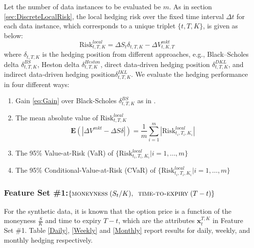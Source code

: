\documentclass[letterpaper,12pt,titlepage,oneside,final]{book}
\numberwithin{equation}{section}
\theoremstyle{definition}
\newcommand{\vx}{\mathbf{x}}
\newcommand{\E}{\mathbf{E}}
\newcommand{\DS}{\Delta S}
\newcommand{\DVmkt}{\Delta V^{mkt}}
\newcommand{\DT}{\Delta t}
\newcommand{\MeanAbs}{\E(|\DVmkt-\DS \delta |)}
\newcommand{\Smkt}{S}
\begin{document}
Let the number of data instances to be evaluated be $m$.
As  in section \ref{sec:DiscreteLocalRisk},  the local hedging risk over the fixed time interval $\DT$ for each data instance, which corresponds to a unique triplet $\{t,T,K\}$, is given as below:
\[
	\text{Risk}^{local}_{t,T,K}=\Delta \Smkt_{t} \delta_{t,T,K} -\Delta V^{mkt}_{t,K,T}
\]
where $\delta_{t,T,K}$ is the hedging position from different approaches, e.g., Black–Scholes delta $\delta^{BS}_{t,T,K}$, Heston delta $\delta^{Heston}_{t,T,K}$, direct data-driven hedging position $\delta^{DKL}_{t,T,K}$, and  indirect data-driven hedging position$\delta^{IKL}_{t,T,K}$.
We evaluate the  hedging performance in four different ways:
\begin{enumerate}
	\item Gain \eqref{eq:Gain} over Black-Scholes $\delta^{BS}_{t,T,K}$ as in \cite{hulloptimal}.
	\item The mean absolute value of $\text{Risk}^{local}_{t,T,K}$
	\[
		\MeanAbs=\frac{1}{m}\sum_{i=1}^m |\text{Risk}^{local}_{t_i,T_i,K_i}|
	\]

	\item The 95\% Value-at-Risk (VaR) of $\{\text{Risk}^{local}_{t_i,T_i,K_i}| i=1,\dots, m\}$
	\item The 95\% Conditional-Value-at-Risk (CVaR) of $\{\text{Risk}^{local}_{t_i,T_i,K_i}| i=1,\dots, m\}$
\end{enumerate}

\subsubsection{Feature Set \#1:$ \{\textsc{moneyness} \;(S_t/K),\;\;\textsc{time-to-expiry} \;(T-t)\}$}
For the synthetic data, it is known that the option price is a function of
 the moneyness $ \frac{S}{K}$ and time to expiry $T-t$, which are the attributes $\vx_{t}^{T,K}$ in Feature Set \#1. Table \ref{Daily}, \ref{Weekly} and \ref{Monthly} report results for daily, weekly, and monthly hedging respectively.
\end{document}
